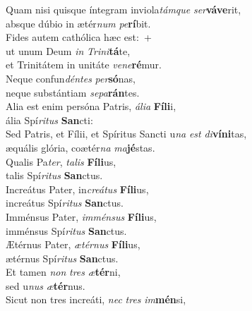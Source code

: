 \evenverse Quam nisi quisque íntegram inviola\textit{tám}\textit{que} \textit{ser}\textbf{vá}\textbf{ve}rit,~\*\\
\evenverse absque dúbio in ætér\textit{num} \textit{pe}\textbf{rí}bit.\\
\oddverse Fides autem cathólica hæc est:~+\\
\oddverse  ut unum Deum \textit{in} \textit{Tri}\textit{ni}\textbf{tá}te,~\*\\
\oddverse et Trinitátem in unitáte \textit{ve}\textit{ne}\textbf{ré}mur.\\
\evenverse Neque confun\textit{dén}\textit{tes} \textit{per}\textbf{só}nas,~\*\\
\evenverse neque substántiam \textit{se}\textit{pa}\textbf{rán}tes.\\
\oddverse Alia est enim persóna Patris, \textit{á}\textit{li}\textit{a} \textbf{Fí}\textbf{li}i,~\*\\
\oddverse ália Spí\textit{ri}\textit{tus} \textbf{San}cti:\\
\evenverse Sed Patris, et Fílii, et Spíritus Sancti u\textit{na} \textit{est} \textit{di}\textbf{ví}\textbf{ni}tas,~\*\\
\evenverse æquális glória, coætér\textit{na} \textit{ma}\textbf{jé}stas.\\
\oddverse Qualis Pa\textit{ter}, \textit{ta}\textit{lis} \textbf{Fí}\textbf{li}us,~\*\\
\oddverse talis Spí\textit{ri}\textit{tus} \textbf{San}ctus.\\
\evenverse Increátus Pater, in\textit{cre}\textit{á}\textit{tus} \textbf{Fí}\textbf{li}us,~\*\\
\evenverse increátus Spí\textit{ri}\textit{tus} \textbf{San}ctus.\\
\oddverse Imménsus Pater, \textit{im}\textit{mén}\textit{sus} \textbf{Fí}\textbf{li}us,~\*\\
\oddverse imménsus Spí\textit{ri}\textit{tus} \textbf{San}ctus.\\
\evenverse Ætérnus Pater, \textit{æ}\textit{tér}\textit{nus} \textbf{Fí}\textbf{li}us,~\*\\
\evenverse ætérnus Spí\textit{ri}\textit{tus} \textbf{San}ctus.\\
\oddverse Et tamen \textit{non} \textit{tres} \textit{æ}\textbf{tér}ni,~\*\\
\oddverse sed u\textit{nus} \textit{æ}\textbf{tér}nus.\\
\evenverse Sicut non tres increáti, \textit{nec} \textit{tres} \textit{im}\textbf{mén}si,~\*\\
